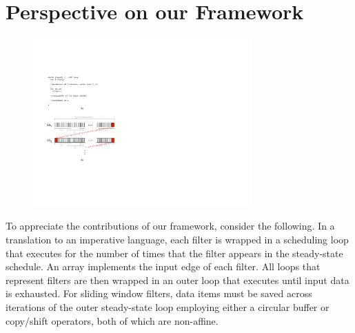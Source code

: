 
\section{Perspective on our Framework}

\begin{figure}[t]
\centering
\includegraphics[width=3.3in]{figures/early-example.pdf}
\caption{\label{fig:comparison}}
\vspace{-10pt}
\end{figure}

To appreciate the contributions of our framework, consider the
following.  In a translation to an imperative language, each filter is
wrapped in a scheduling loop that executes for the number of times
that the filter appears in the steady-state schedule. An array
implements the input edge of each filter.  All loops that represent
filters are then wrapped in an outer loop that executes until input
data is exhausted.  For sliding window filters, data items must be
saved across iterations of the outer steady-state loop employing
either a circular buffer or copy/shift operators, both of which are
non-affine.

